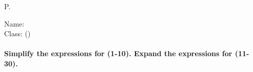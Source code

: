 \documentclass[11pt,a4paper, addpoints] {exam}
\begin{document}
\setlength\dottedlinefillheight{0.79cm}
\footer{}
       {P.\thepage}{}
\headrule 
\footrule


		{}
		{\textsf{Name:} \underline{\hspace{2.85cm}}\\
                  \hfill \textsf{Class:} \underline{\hspace{1.8cm}}(\qquad)}
\paragraph*{Simplify the expressions for (1-10). Expand the expressions for (11-30).}
\end{document}
